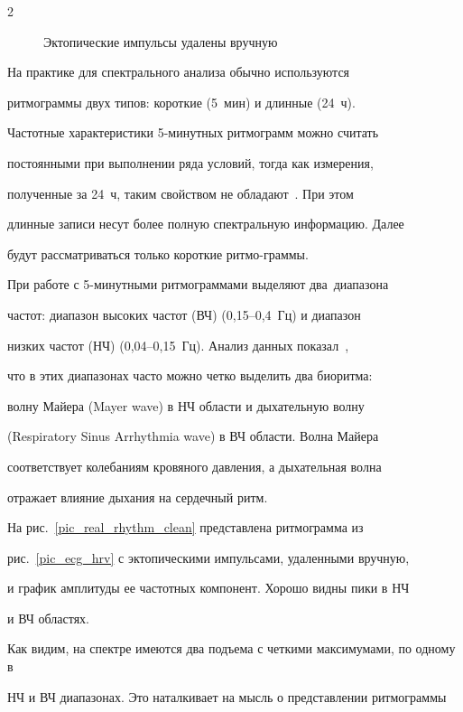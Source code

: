 \begin{multicols}{2}
\begin{figure}
{Эктопические импульсы удалены вручную 


}


\end{figure}





На практике для спектрального анализа  обычно используются


ритмограммы двух типов: короткие (5~мин) и длинные (24~ч).


Частотные характеристики 5-минутных ритмограмм можно считать


постоянными при выполнении ряда условий, тогда как измерения,


полученные за 24~ч, таким свойством не обладают~\cite{1ma}. При этом


длинные записи несут более полную спектральную информацию. Далее


будут рассматриваться только короткие ритмо-\linebreak граммы.





При работе с 5-минутными ритмограммами  выделяют два~диапазона


час\-тот: диапазон высоких час\-тот (ВЧ) (0,15--0,4~Гц) и диапазон


низких частот (НЧ) (0,04--0,15~Гц). Анализ данных показал~\cite{1ma, 2ma},


что в этих диапазонах часто можно четко выделить два биоритма:


волну Майера (Mayer wave) в НЧ области и дыхательную волну


(Respiratory Sinus Arrhythmia wave) в ВЧ области. Волна Майера


соответствует колебаниям кровяного давления, а дыхательная волна


отражает влияние дыхания на сердечный ритм.


На рис.~\ref{pic_real_rhythm_clean} представлена ритмограмма из


рис.~\ref{pic_ecg_hrv} с эктопическими импульсами, удаленными вручную,


и график амплитуды ее час\-тот\-ных компонент. Хорошо видны пики в НЧ


и ВЧ областях.





Как видим, на спектре имеются два подъема с четкими максимумами, по одному в 


НЧ и ВЧ диапазонах. Это наталкивает на мысль о пред\-став\-ле\-нии ритмограммы 



\end{multicols}
